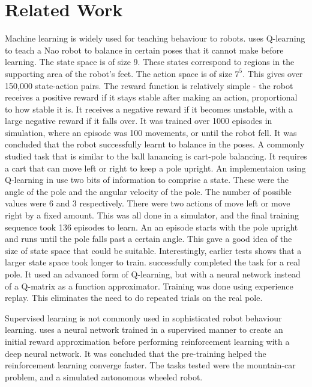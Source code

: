 \documentclass[12pt,a4paper]{article}
\begin{document}
\section{Related Work}
Machine learning is widely used for teaching behaviour to robots. \cite{nao_balance} uses Q-learning to teach a Nao robot to balance in certain poses that it cannot make before learning. The state space is of size 9. These states correspond to regions in the supporting area of the robot's feet. The action space is of size $7^5$. This gives over 150,000 state-action pairs. The reward function is relatively simple - the robot receives a positive reward if it stays stable after making an action, proportional to how stable it is. It receives a negative reward if it becomes unstable, with a large negative reward if it falls over. It was trained over 1000 episodes in simulation, where an episode was 100 movements, or until the robot fell. It was concluded that the robot successfully learnt to balance in the poses. A commonly studied task that is similar to the ball lanancing is cart-pole balancing. It requires a cart that can move left or right to keep a pole upright. An implementaion using Q-learning in \cite{cart_pole_webpage} use two bits of information to comprise a state. These were the angle of the pole and the angular velocity of the pole. The number of possible values were 6 and 3 respectively. There were two actions of move left or move right by a fixed amount. This was all done in a simulator, and the final training sequence took 136 episodes to learn. An an episode starts with the pole upright and runs until the pole falls past a certain angle. This gave a good idea of the size of state space that could be suitable. Interestingly, earlier tests shows that a larger state space took longer to train. \cite{real_pole} successfully completed the task for a real pole. It used an advanced form of Q-learning, but with a neural network instead of a Q-matrix as a function approximator. Training was done using experience replay. This eliminates the need to do repeated trials on the real pole.

Supervised learning is not commonly used in sophisticated robot behaviour learning. \cite{nn_then_dnn} uses a neural network trained in a supervised manner to create an initial reward approximation before performing reinforcement learning with a deep neural network. It was concluded that the pre-training helped the reinforcement learning converge faster. The tasks tested were the mountain-car problem, and a simulated autonomous wheeled robot.
\end{document}

